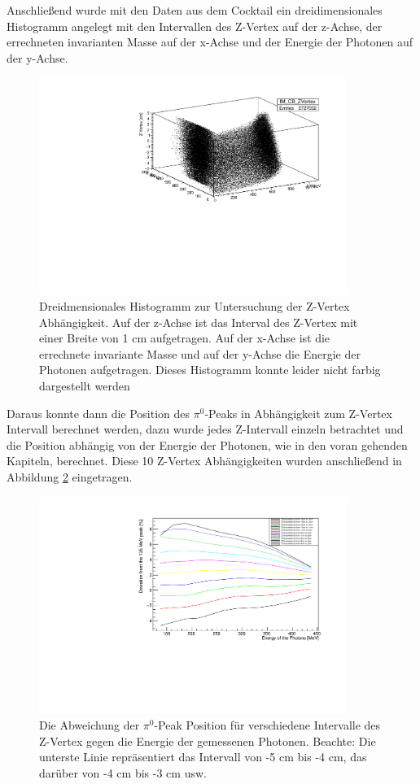 \documentclass[a4paper,11pt,oneside,final,german,openbib,pdftex]{scrbook}
\begin{document}
 Anschließend wurde mit den Daten aus dem Cocktail ein dreidimensionales Histogramm angelegt mit den Intervallen des Z-Vertex auf der z-Achse, der errechneten invarianten Masse auf der x-Achse und der Energie der Photonen auf der y-Achse. 

\begin{figure}[h!]
	\begin{center}
		\includegraphics[width=100mm]{ZVertex3DHisto}
		\caption{Dreidmensionales Histogramm zur Untersuchung der Z-Vertex Abh\"angigkeit. Auf der z-Achse ist das Interval des Z-Vertex mit einer Breite von 1 cm aufgetragen. Auf der x-Achse ist die errechnete invariante Masse und auf der y-Achse die Energie der Photonen aufgetragen. Dieses Histogramm konnte leider nicht farbig dargestellt werden}
		\label{fig:Z-Vertex-3D-Histogramm}
	\end{center}
\end{figure}

Daraus konnte dann die Position des $\pi^0$-Peaks in Abhängigkeit zum Z-Vertex Intervall berechnet werden, dazu wurde jedes Z-Intervall einzeln betrachtet und die Position abhängig von der Energie der Photonen, wie in den voran gehenden Kapiteln, berechnet.
Diese 10 Z-Vertex Abhängigkeiten wurden anschließend in Abbildung \ref{fig:Z-Vertex-Multi-Graph} eingetragen.

\begin{figure}[h!]
	\begin{center}
		\includegraphics[width=100mm]{FullZVertexDependence}
		\caption{Die Abweichung der $\pi^0$-Peak Position für verschiedene Intervalle des Z-Vertex gegen die Energie der gemessenen Photonen. Beachte: Die unterste Linie repr\"asentiert das Intervall von -5 cm bis -4 cm, das dar\"uber von -4 cm bis -3 cm usw.}
		\label{fig:Z-Vertex-Multi-Graph}
	\end{center}
\end{figure}
\end{document}
